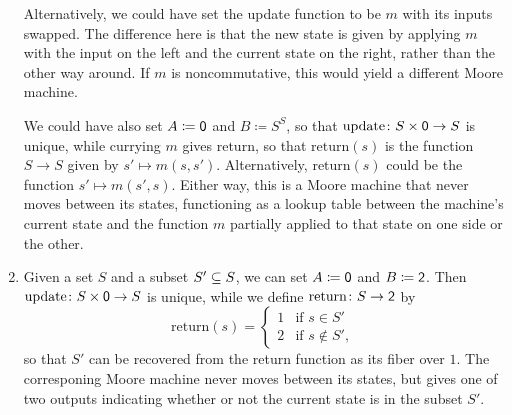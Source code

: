 \documentclass[Book-Poly]{subfiles}
\begin{document}
\begin{exercise}
\begin{solution}
\begin{enumerate}
    Alternatively, we could have set the update function to be $m$ with its inputs swapped.
    The difference here is that the new state is given by applying $m$ with the input on the left and the current state on the right, rather than the other way around.
    If $m$ is noncommutative, this would yield a different Moore machine.
    
    We could have also set $A \coloneqq \0$ and $B \coloneqq S^S$, so that $\text{update} \colon S \times \0 \to S$ is unique, while currying $m$ gives $\text{return}$, so that $\text{return}(s)$ is the function $S \to S$ given by $s' \mapsto m(s, s')$.
    Alternatively, $\text{return}(s)$ could be the function $s' \mapsto m(s', s)$.
    Either way, this is a Moore machine that never moves between its states, functioning as a lookup table between the machine's current state and the function $m$ partially applied to that state on one side or the other.
    
    \item Given a set $S$ and a subset $S' \ss S$, we can set $A \coloneqq \0$ and $B \coloneqq \2$.
    Then $\text{update} \colon S \times \0 \to S$ is unique, while we define $\text{return} \colon S \to \2$ by
    \[
        \text{return}(s) =
        \begin{cases}
            1 & \text{if } s \in S' \\
            2 & \text{if } s \notin S',
        \end{cases}
    \]
    so that $S'$ can be recovered from the return function as its fiber over $1$.
    The corresponing Moore machine never moves between its states, but gives one of two outputs indicating whether or not the current state is in the subset $S'$.
\end{enumerate}
\end{solution}
\end{exercise}
\end{document}
